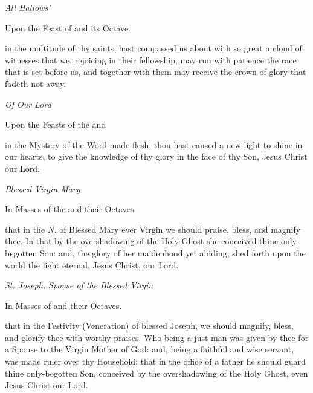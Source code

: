 \begin{multicols}{2}
\centerline{\textit{All Hallows'}}
\begin{rubric}
	Upon the Feast of  and its Octave.
\end{rubric}
 in the multitude of thy saints, hast compassed us about with so great a cloud of witnesses that we, rejoicing in their fellowship, may run with patience the race that is set before us, and together with them may receive the crown of glory that fadeth not away.\\

\newcolumn

\centerline{\textit{Of Our Lord}}
\begin{rubric}
	Upon the Feasts of the   and 
\end{rubric}
 in the Mystery of the Word made flesh, thou hast caused a new light to shine in our hearts, to give the knowledge of thy glory in the face of thy Son, Jesus Christ our Lord.\\

\centerline{\textit{Blessed Virgin Mary}}
\begin{rubric}
	In Masses of the  and their Octaves.
\end{rubric}
 that in the \textit{N.} of Blessed Mary ever Virgin we should praise, bless, and magnify thee. In that by the overshadowing of the Holy Ghost she conceived thine only-begotten Son: and, the glory of her maidenhood yet abiding, shed forth upon the world the light eternal, Jesus Christ, our Lord.\\

\centerline{\textit{St. Joseph, Spouse of the Blessed Virgin}}
\begin{rubric}
	In Masses of  and their Octaves.
\end{rubric}
 that in the Festivity (Veneration) of blessed Joseph, we should magnify, bless, and glorify thee with worthy praises. Who being a just man was given by thee for a Spouse to the Virgin Mother of God: and, being a faithful and wise servant, was made ruler over thy Household: that in the office of a father he should guard thine only-begotten Son, conceived by the overshadowing of the Holy Ghost, even Jesus Christ our Lord.\\


\end{multicols}
